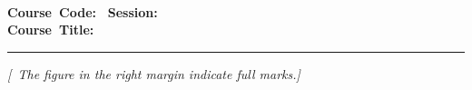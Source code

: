 
\begin{center}
	\textbf{\Large{\institutionName{}}}\\[2pt]
	\textbf{\large{\deptName{}}}\\[2pt]
	\textbf{\examName{}}\\[2pt]
	\textbf{Course~Code:~\courseCode{}} \hspace{10mm} \textbf{Session:}~\SessionExaminee\\[2pt]
	\textbf{Course~Title:}~\courseTitle{}\\
	
	
	
\end{center}

\vspace{1mm}
\noindent
{}

\vspace{-2.0mm}
\noindent\rule{\textwidth}{2pt}

\begin{center}
\vspace{-2.0mm}
\textit{[\specialInstruction{}~The figure in the right margin indicate full marks.]}
\end{center}
\vspace{2mm}
